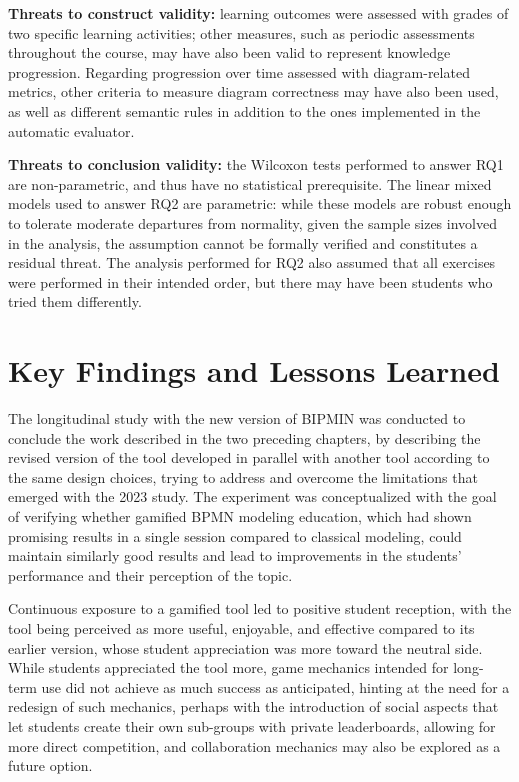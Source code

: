 \textbf{Threats to construct validity:} learning outcomes were assessed with grades of two specific learning activities; other measures, such as periodic assessments throughout the course, may have also been valid to represent knowledge progression. Regarding progression over time assessed with diagram-related metrics, other criteria to measure diagram correctness may have also been used, as well as different semantic rules in addition to the ones implemented in the automatic evaluator.

\textbf{Threats to conclusion validity:} the Wilcoxon tests performed to answer RQ1 are non-parametric, and thus have no statistical prerequisite. The linear mixed models used to answer RQ2 are parametric: while these models are robust enough to tolerate moderate departures from normality, given the sample sizes involved in the analysis, the assumption cannot be formally verified and constitutes a residual threat. The analysis performed for RQ2 also assumed that all exercises were performed in their intended order, but there may have been students who tried them differently.

\section{Key Findings and Lessons Learned}

The longitudinal study with the new version of BIPMIN was conducted to conclude the work described in the two preceding chapters, by describing the revised version of the tool developed in parallel with another tool according to the same design choices, trying to address and overcome the limitations that emerged with the 2023 study. The experiment was conceptualized with the goal of verifying whether gamified BPMN modeling education, which had shown promising results in a single session compared to classical modeling, could maintain similarly good results and lead to improvements in the students' performance and their perception of the topic.

Continuous exposure to a gamified tool led to positive student reception, with the tool being perceived as more useful, enjoyable, and effective compared to its earlier version, whose student appreciation was more toward the neutral side. While students appreciated the tool more, game mechanics intended for long-term use did not achieve as much success as anticipated, hinting at the need for a redesign of such mechanics, perhaps with the introduction of social aspects that let students create their own sub-groups with private leaderboards, allowing for more direct competition, and collaboration mechanics may also be explored as a future option.

